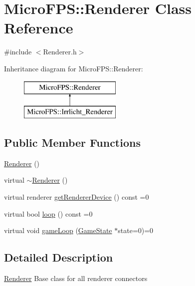 \hypertarget{class_micro_f_p_s_1_1_renderer}{
\section{MicroFPS::Renderer Class Reference}
\label{d6/de2/class_micro_f_p_s_1_1_renderer}
}


{\ttfamily \#include $<$Renderer.h$>$}

Inheritance diagram for MicroFPS::Renderer:\begin{figure}[H]
\begin{center}
\leavevmode
\includegraphics[height=2.000000cm]{d6/de2/class_micro_f_p_s_1_1_renderer}
\end{center}
\end{figure}
\subsection*{Public Member Functions}
\begin{DoxyCompactItemize}
\item 
\hyperlink{class_micro_f_p_s_1_1_renderer_a6e485790e7feded6cda1c6c69cf20940}{Renderer} ()
\item 
virtual \hyperlink{class_micro_f_p_s_1_1_renderer_a89ef8839d0624fc08d55bcad40a4898d}{$\sim$Renderer} ()
\item 
virtual renderer \hyperlink{class_micro_f_p_s_1_1_renderer_a092a7585391cd2a6067c80d8d989e8dd}{getRendererDevice} () const =0
\item 
virtual bool \hyperlink{class_micro_f_p_s_1_1_renderer_aa46366c0a7f0e4c9f28c05db06686d68}{loop} () const =0
\item 
virtual void \hyperlink{class_micro_f_p_s_1_1_renderer_a31ab8d73752b31952ff0895923f8c17b}{gameLoop} (\hyperlink{class_micro_f_p_s_1_1_game_state}{GameState} $\ast$state=0)=0
\end{DoxyCompactItemize}


\subsection{Detailed Description}
\hyperlink{class_micro_f_p_s_1_1_renderer}{Renderer} Base class for all renderer connectors 

